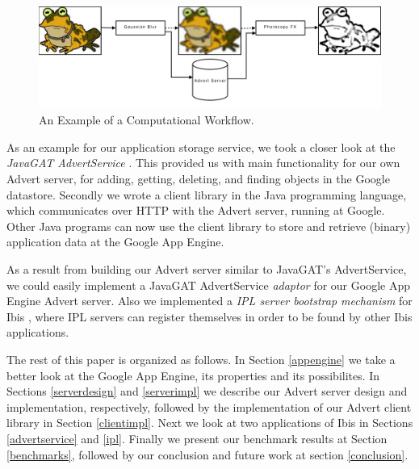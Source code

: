 \begin{figure}[ht] %
\begin{center}
\includegraphics[width=14cm]{./figures/image_workflow.pdf} 
\caption{An Example of a Computational Workflow.\label{img-workflow}}
\end{center}
\end{figure}

As an example for our application storage service, we took a closer look at
the \emph{JavaGAT AdvertService} \cite{javagat-www}. This provided us with main
functionality for our own Advert server, for adding, getting, deleting, and
finding objects in the Google datastore. Secondly we wrote a client library in
the Java programming language, which communicates over HTTP with the Advert
server, running at Google. Other Java programs can now use the client library
to store and retrieve (binary) application data at the Google App Engine.

As a result from building our Advert server similar to JavaGAT's AdvertService,
we could easily implement a JavaGAT AdvertService \emph{adaptor} for our
Google App Engine Advert server. Also we implemented a \emph{IPL server
bootstrap mechanism} for Ibis \cite{ipl-www}, where IPL servers can register
themselves in order to be found by other Ibis applications.

The rest of this paper is organized as follows. In Section \ref{appengine}
we take a better look at the Google App Engine, its properties and its
possibilites. In Sections \ref{serverdesign} and \ref{serverimpl} we describe
our Advert server design and implementation, respectively, followed by the
implementation of our Advert client library in Section \ref{clientimpl}. Next
we look at two applications of Ibis in Sections \ref{advertservice} and
\ref{ipl}. Finally we present our benchmark results at Section
\ref{benchmarks}, followed by our conclusion and future work at section
\ref{conclusion}.
